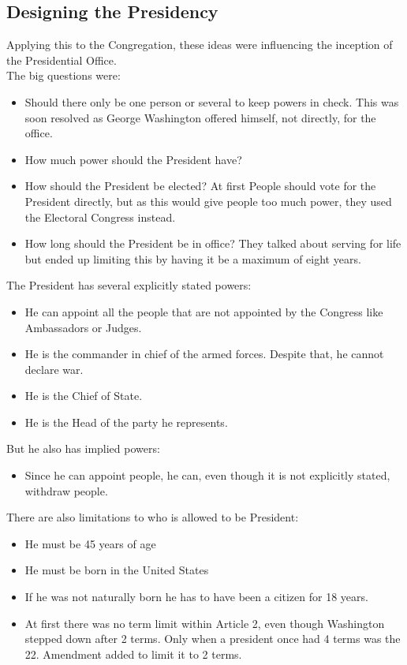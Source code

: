\documentclass{article}
\begin{document}
	\subsection{Designing the Presidency}
	Applying this to the Congregation, these ideas were influencing the inception of the Presidential Office. \\
	The big questions were:
	\begin{itemize}
		\item{Should there only be one person or several to keep powers in check. This was soon resolved as George Washington offered himself, not directly, for the office.}
		\item{How much power should the President have?}
		\item{How should the President be elected? At first People should vote for the President directly, but as this would give people too much power, they used the Electoral Congress instead.}
		\item{How long should the President be in office? They talked about serving for life but ended up limiting this by having it be a maximum of eight years.}
	\end{itemize}
	The President has several explicitly stated powers: 
	\begin{itemize}
		\item{He can appoint all the people that are not appointed by the Congress like Ambassadors or Judges.}
		\item{He is the commander in chief of the armed forces. Despite that, he cannot declare war.}
		\item{He is the Chief of State.}
		\item{He is the Head of the party he represents.}
	\end{itemize}
	But he also has implied powers:
	\begin{itemize}
		\item{Since he can appoint people, he can, even though it is not explicitly stated, withdraw people.}
	\end{itemize}
	There are also limitations to who is allowed to be President:
	\begin{itemize}
		\item{He must be 45 years of age}
		\item{He must be born in the United States}
		\item{If he was not naturally born he has to have been a citizen for 18 years.}
		\item{At first there was no term limit within Article 2, even though Washington stepped down after 2 terms. Only when a president once had 4 terms was the 22. Amendment added to limit it to 2 terms.}
	\end{itemize}
\end{document}
